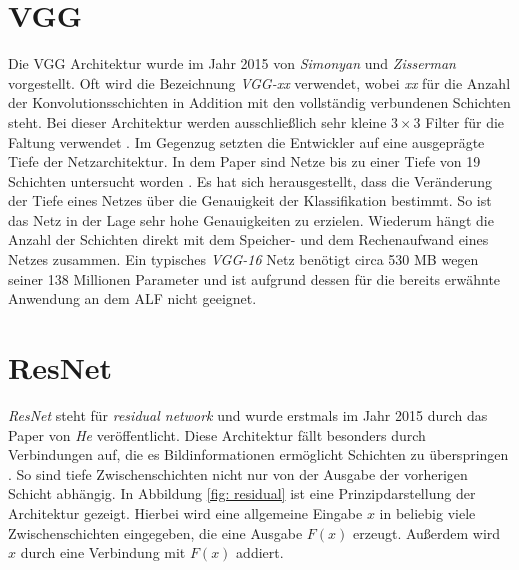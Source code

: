 		\section*{VGG}
		\label{subsec: vgg}
		Die VGG Architektur wurde im Jahr 2015 von \textit{Simonyan} und \textit{Zisserman} \cite{vgg} vorgestellt. Oft wird die Bezeichnung \textit{VGG-xx} verwendet, wobei \textit{xx} für die Anzahl der Konvolutionsschichten in Addition mit den vollständig verbundenen Schichten steht. Bei dieser Architektur werden ausschließlich sehr kleine $3 \times 3$ Filter für die Faltung verwendet \cite{vgg}. Im Gegenzug setzten die Entwickler auf eine ausgeprägte Tiefe der Netzarchitektur. In dem Paper sind Netze bis zu einer Tiefe von 19 Schichten untersucht worden \cite{vgg}. Es hat sich herausgestellt, dass die Veränderung der Tiefe eines Netzes über die Genauigkeit der Klassifikation bestimmt. So ist das Netz in der Lage sehr hohe Genauigkeiten zu erzielen. Wiederum hängt die Anzahl der Schichten direkt mit dem Speicher- und dem Rechenaufwand eines Netzes zusammen. Ein typisches \textit{VGG-16} Netz benötigt circa 530 MB wegen seiner 138 Millionen Parameter und ist aufgrund dessen für die bereits erwähnte Anwendung an dem ALF nicht geeignet.\\
		
		\section*{ResNet}
		\label{subsec: resnet}
		\textit{ResNet} steht für \textit{residual network} und wurde erstmals im Jahr 2015 durch das Paper von \textit{He} veröffentlicht. Diese Architektur fällt besonders durch Verbindungen auf, die es Bildinformationen ermöglicht Schichten zu überspringen \cite{resnet}. So sind tiefe Zwischenschichten nicht nur von der Ausgabe der vorherigen Schicht abhängig. In Abbildung \ref{fig: residual} ist eine Prinzipdarstellung der Architektur gezeigt. Hierbei wird eine allgemeine Eingabe $x$ in beliebig viele Zwischenschichten eingegeben, die eine Ausgabe $F(x)$ erzeugt. Außerdem wird $x$ durch eine Verbindung mit $F(x)$ addiert.
		
